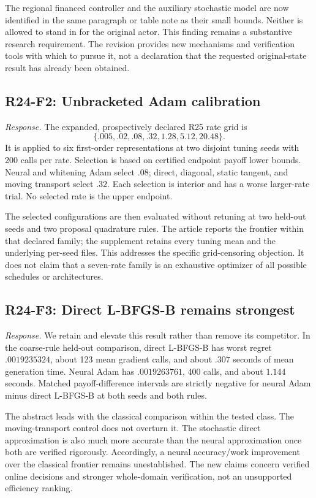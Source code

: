 The regional financed controller and the auxiliary stochastic model are now identified in the same paragraph or table note as their small bounds. Neither is allowed to stand in for the original actor. This finding remains a substantive research requirement. The revision provides new mechanisms and verification tools with which to pursue it, not a declaration that the requested original-state result has already been obtained.

\subsection{R24-F2: Unbracketed Adam calibration}
\emph{Response.} The expanded, prospectively declared R25 rate grid is
\[\{.005,.02,.08,.32,1.28,5.12,20.48\}.\]
It is applied to six first-order representations at two disjoint tuning seeds with 200 calls per rate. Selection is based on certified endpoint payoff lower bounds. Neural and whitening Adam select $.08$; direct, diagonal, static tangent, and moving transport select $.32$. Each selection is interior and has a worse larger-rate trial. No selected rate is the upper endpoint.

The selected configurations are then evaluated without retuning at two held-out seeds and two proposal quadrature rules. The article reports the frontier within that declared family; the supplement retains every tuning mean and the underlying per-seed files. This addresses the specific grid-censoring objection. It does not claim that a seven-rate family is an exhaustive optimizer of all possible schedules or architectures.

\subsection{R24-F3: Direct L-BFGS-B remains strongest}
\emph{Response.} We retain and elevate this result rather than remove its competitor. In the coarse-rule held-out comparison, direct L-BFGS-B has worst regret $.0019235324$, about 123 mean gradient calls, and about $.307$ seconds of mean generation time. Neural Adam has $.0019263761$, 400 calls, and about $1.144$ seconds. Matched payoff-difference intervals are strictly negative for neural Adam minus direct L-BFGS-B at both seeds and both rules.

The abstract leads with the classical comparison within the tested class. The moving-transport control does not overturn it. The stochastic direct approximation is also much more accurate than the neural approximation once both are verified rigorously. Accordingly, a neural accuracy/work improvement over the classical frontier remains unestablished. The new claims concern verified online decisions and stronger whole-domain verification, not an unsupported efficiency ranking.

